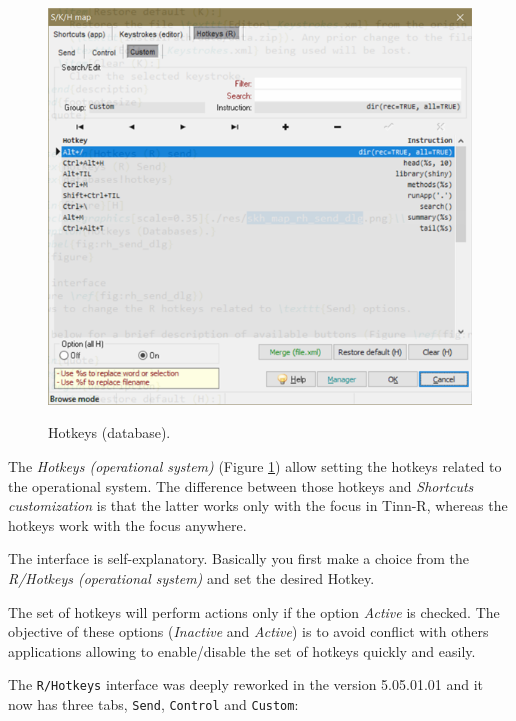\begin{figure}[H]
  \includegraphics[scale=0.6]{./res/dlg_skh_map_rh_custom.png}\\
  \caption{Hotkeys (database).}
  \label{fig:dlg_skh_map_hotkeys}
\end{figure}

The \textit{Hotkeys (operational system)}
(Figure \ref{fig:dlg_skh_map_hotkeys})
allow setting the hotkeys
related to the operational system. The difference between those hotkeys and
\textit{Shortcuts customization} is that the latter works only with the
focus in Tinn-R, whereas the hotkeys work with the focus anywhere.

The interface is self-explanatory. Basically you first make a choice from
the \textit{R/Hotkeys (operational system)} and set the desired Hotkey.

The set of hotkeys will perform actions only if the option \textit{Active}
is checked. The objective of these options (\textit{Inactive} and
\textit{Active}) is to avoid conflict with others applications allowing
to enable/disable the set of hotkeys quickly and easily.

The \texttt{R/Hotkeys} interface was deeply reworked in the version 5.05.01.01 and it now has three tabs,
\texttt{Send}, \texttt{Control} and \texttt{Custom}:

